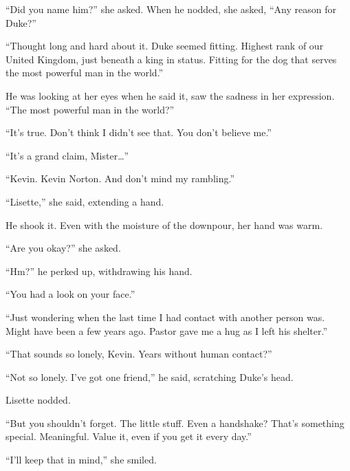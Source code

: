 ``Did you name him?'' she asked.  When he nodded, she asked, ``Any reason for Duke?''



``Thought long and hard about it.  Duke seemed fitting.  Highest rank of our United Kingdom, just beneath a king in status.  Fitting for the dog that serves the most powerful man in the world.''



He was looking at her eyes when he said it, saw the sadness in her expression.  ``The most powerful man in the world?''



``It's true.  Don't think I didn't see that.  You don't believe me.''



``It's a grand claim, Mister\ldots''



``Kevin.  Kevin Norton.  And don't mind my rambling.''



``Lisette,'' she said, extending a hand.



He shook it.  Even with the moisture of the downpour, her hand was warm.



``Are you okay?'' she asked.



``Hm?'' he perked up, withdrawing his hand.



``You had a look on your face.''



``Just wondering when the last time I had contact with another person was.  Might have been a few years ago.  Pastor gave me a hug as I left his shelter.''



``That sounds so lonely, Kevin.  Years without human contact?''



``Not so lonely.  I've got one friend,'' he said, scratching Duke's head.



Lisette nodded.



``But you shouldn't forget.  The little stuff.  Even a handshake?  That's something special.  Meaningful.  Value it, even if you get it every day.''



``I'll keep that in mind,'' she smiled.



